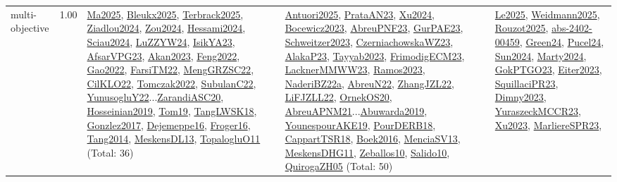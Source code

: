 {\begin{longtable}{p{3cm}r>{\raggedright\arraybackslash}p{6cm}>{\raggedright\arraybackslash}p{6cm}>{\raggedright\arraybackslash}p{8cm}}
\index{multi-objective}\index{Concepts!multi-objective}multi-objective &  1.00 & \hyperref[detail:Ma2025]{Ma2025}, \hyperref[detail:Bleukx2025]{Bleukx2025}, \hyperref[detail:Terbrack2025]{Terbrack2025}, \hyperref[detail:Ziadlou2024]{Ziadlou2024}, \hyperref[detail:Zou2024]{Zou2024}, \hyperref[detail:Hessami2024]{Hessami2024}, \hyperref[detail:Sciau2024]{Sciau2024}, \hyperref[detail:LuZZYW24]{LuZZYW24}, \hyperref[detail:IsikYA23]{IsikYA23}, \hyperref[detail:AfsarVPG23]{AfsarVPG23}, \hyperref[detail:Akan2023]{Akan2023}, \hyperref[detail:Feng2022]{Feng2022}, \hyperref[detail:Gao2022]{Gao2022}, \hyperref[detail:FarsiTM22]{FarsiTM22}, \hyperref[detail:MengGRZSC22]{MengGRZSC22}, \hyperref[detail:CilKLO22]{CilKLO22}, \hyperref[detail:Tomczak2022]{Tomczak2022}, \hyperref[detail:SubulanC22]{SubulanC22}, \hyperref[detail:YunusogluY22]{YunusogluY22}...\hyperref[detail:ZarandiASC20]{ZarandiASC20}, \hyperref[detail:Hosseinian2019]{Hosseinian2019}, \hyperref[detail:Tom19]{Tom19}, \hyperref[detail:TangLWSK18]{TangLWSK18}, \hyperref[detail:Gonzlez2017]{Gonzlez2017}, \hyperref[detail:Dejemeppe16]{Dejemeppe16}, \hyperref[detail:Froger16]{Froger16}, \hyperref[detail:Tang2014]{Tang2014}, \hyperref[detail:MeskensDL13]{MeskensDL13}, \hyperref[detail:TopalogluO11]{TopalogluO11} (Total: 36) & \hyperref[detail:Antuori2025]{Antuori2025}, \hyperref[detail:PrataAN23]{PrataAN23}, \hyperref[detail:Xu2024]{Xu2024}, \hyperref[detail:Bocewicz2023]{Bocewicz2023}, \hyperref[detail:AbreuPNF23]{AbreuPNF23}, \hyperref[detail:GurPAE23]{GurPAE23}, \hyperref[detail:Schweitzer2023]{Schweitzer2023}, \hyperref[detail:CzerniachowskaWZ23]{CzerniachowskaWZ23}, \hyperref[detail:AlakaP23]{AlakaP23}, \hyperref[detail:Tayyab2023]{Tayyab2023}, \hyperref[detail:FrimodigECM23]{FrimodigECM23}, \hyperref[detail:LacknerMMWW23]{LacknerMMWW23}, \hyperref[detail:Ramos2023]{Ramos2023}, \hyperref[detail:NaderiBZ22a]{NaderiBZ22a}, \hyperref[detail:AbreuN22]{AbreuN22}, \hyperref[detail:ZhangJZL22]{ZhangJZL22}, \hyperref[detail:LiFJZLL22]{LiFJZLL22}, \hyperref[detail:OrnekOS20]{OrnekOS20}, \hyperref[detail:AbreuAPNM21]{AbreuAPNM21}...\hyperref[detail:Abuwarda2019]{Abuwarda2019}, \hyperref[detail:YounespourAKE19]{YounespourAKE19}, \hyperref[detail:PourDERB18]{PourDERB18}, \hyperref[detail:CappartTSR18]{CappartTSR18}, \hyperref[detail:Boek2016]{Boek2016}, \hyperref[detail:MenciaSV13]{MenciaSV13}, \hyperref[detail:MeskensDHG11]{MeskensDHG11}, \hyperref[detail:Zeballos10]{Zeballos10}, \hyperref[detail:Salido10]{Salido10}, \hyperref[detail:QuirogaZH05]{QuirogaZH05} (Total: 50) & \hyperref[detail:Le2025]{Le2025}, \hyperref[detail:Weidmann2025]{Weidmann2025}, \hyperref[detail:Rouzot2025]{Rouzot2025}, \hyperref[detail:abs-2402-00459]{abs-2402-00459}, \hyperref[detail:Green24]{Green24}, \hyperref[detail:Pucel24]{Pucel24}, \hyperref[detail:Sun2024]{Sun2024}, \hyperref[detail:Marty2024]{Marty2024}, \hyperref[detail:GokPTGO23]{GokPTGO23}, \hyperref[detail:Eiter2023]{Eiter2023}, \hyperref[detail:SquillaciPR23]{SquillaciPR23}, \hyperref[detail:Dimny2023]{Dimny2023}, \hyperref[detail:YuraszeckMCCR23]{YuraszeckMCCR23}, \hyperref[detail:Xu2023]{Xu2023}, \hyperref[detail:MarliereSPR23]{MarliereSPR23}, 
\end{longtable}}
